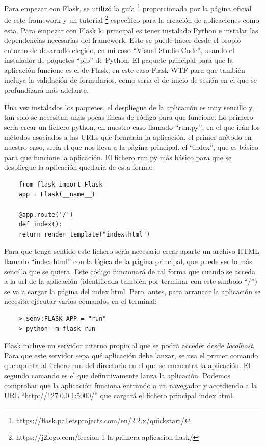 Para empezar con Flask, se utilizó la guía \footnote{https://flask.palletsprojects.com/en/2.2.x/quickstart/} proporcionada por la página oficial de este framework y un tutorial \footnote{https://j2logo.com/leccion-1-la-primera-aplicacion-flask/} específico para la creación de aplicaciones como esta. Para empezar con Flask lo principal es tener instalado Python e instalar las dependencias necesarias del framework. Esto se puede hacer desde el propio entorno de desarrollo elegido, en mi caso ``Visual Studio Code'', usando el instalador de paquetes ``pip'' de Python. El paquete principal para que la aplicación funcione es el de Flask, en este caso Flask-WTF para que también incluya la validación de formularios, como sería el de inicio de sesión en el que se profundizará más adelante.  

Una vez instalados los paquetes, el despliegue de la aplicación es muy sencillo y, tan solo se necesitan unas pocas líneas de código para que funcione. Lo primero sería crear un fichero python, en nuestro caso llamado ``run.py'', en el que irán los métodos asociados a las URLs que formarán la aplicación, el primer método en nuestro caso, sería el que nos lleva a la página principal, el ``index'', que es básico para que funcione la aplicación. El fichero run.py más básico para que se despliegue la aplicación quedaría de esta forma:

\begin{verbatim}
	from flask import Flask
	app = Flask(__name__)
	
	@app.route('/')
	def index():
	return render_template("index.html")
\end{verbatim}

Para que tenga sentido este fichero sería necesario crear aparte un archivo HTML llamado ``index.html'' con la lógica de la página principal, que puede ser lo más sencilla que se quiera. Este código funcionará de tal forma que cuando se acceda a la url de la aplicación (identificada también por terminar con este símbolo ``/'') se va a cargar la página del index.html. Pero, antes, para arrancar la aplicación se necesita ejecutar varios comandos en el terminal:

\begin{verbatim}
	> $env:FLASK_APP = "run"
	> python -m flask run
\end{verbatim}

Flask incluye un servidor interno propio al que se podrá acceder desde \textit{localhost}. Para que este servidor sepa qué aplicación debe lanzar, se usa el primer comando que apunta al fichero run del directorio en el que se encuentra la aplicación. El segundo comando es el que definitivamente lanza la aplicación. Podemos comprobar que la aplicación funciona entrando a un navegador y accediendo a la URL ``http://127.0.0.1:5000/'' que cargará el fichero principal index.html. 

